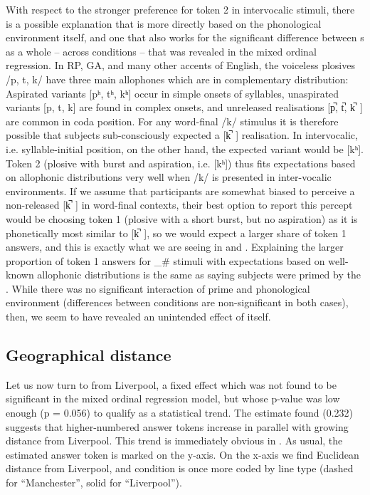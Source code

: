 With respect to the stronger preference for token 2 in intervocalic stimuli, there is a possible explanation that is more directly based on the phonological environment itself, and one that also works for the significant difference between s as a whole -- across  conditions -- that was revealed in the mixed ordinal regression.
In RP, GA, and many other accents of English, the voiceless plosives /p, t, k/ have three main allophones which are in complementary distribution: Aspirated variants [pʰ, tʰ, kʰ] occur in simple onsets of syllables, unaspirated variants [p, t, k] are found in complex onsets, and unreleased realisations [p̚, t̚, k̚~] are common in coda position.
For any word-final /k/ stimulus it is therefore possible that subjects sub-consciously expected a [k̚~] realisation.
In intervocalic, i.e. syllable-initial position, on the other hand, the expected variant would be [kʰ].
Token 2 (plosive with burst and aspiration, i.e. [kʰ]) thus fits expectations based on allophonic distributions very well when /k/ is presented in inter-vocalic environments.
If we assume that participants are somewhat biased to perceive a non-released [k̚~] in word-final contexts, their best option to report this percept would be choosing token 1 (plosive with a short burst, but no aspiration) as it is phonetically most similar to [k̚~], so we would expect a larger share of token 1 answers, and this is exactly what we are seeing in  and .
Explaining the larger proportion of token 1 answers for \_\# stimuli with expectations based on well-known allophonic distributions is the same as saying subjects were primed by the .
While there was no significant interaction of prime and phonological environment (differences between conditions are non-significant in both cases), then, we seem to have revealed an unintended  effect of  itself.

\subsection{Geographical distance}
\label{sec.perc_res.k.geography}

Let us now turn to  from Liverpool, a fixed effect which was not found to be significant in the mixed ordinal regression model, but whose p-value was low enough (p = 0.056) to qualify as a statistical trend.
The estimate found (0.232) suggests that higher-numbered answer tokens increase in parallel with growing distance from Liverpool.
This trend is immediately obvious in .
As usual, the estimated answer token is marked on the y-axis.
On the x-axis we find Euclidean distance from Liverpool, and  condition is once more coded by line type (dashed for ``Manchester'', solid for ``Liverpool'').

